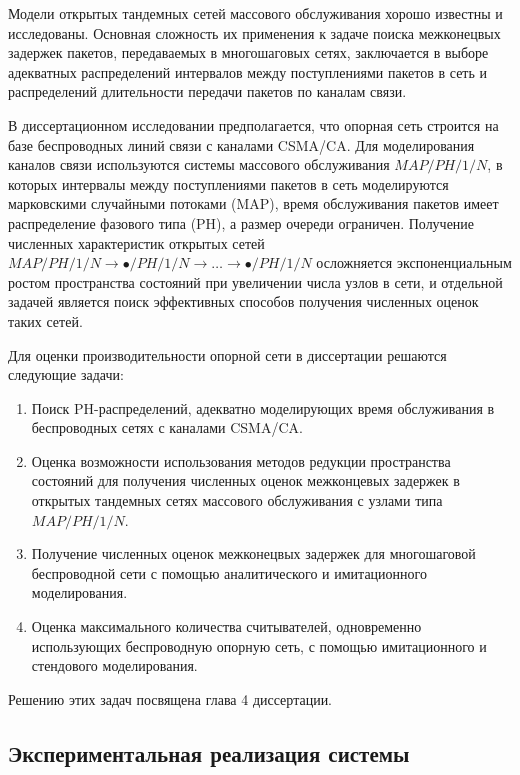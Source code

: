 Модели открытых тандемных сетей массового обслуживания хорошо известны и исследованы. Основная сложность их применения к задаче поиска межконецвых задержек пакетов, передаваемых в многошаговых сетях, заключается в выборе адекватных распределений интервалов между поступлениями пакетов в сеть и распределений длительности передачи пакетов по каналам связи.

В диссертационном исследовании предполагается, что опорная сеть строится на базе беспроводных линий связи с каналами CSMA/CA. Для моделирования каналов связи используются системы массового обслуживания $MAP/PH/1/N$, в которых интервалы между поступлениями пакетов в сеть моделируются марковскими случайными потоками (MAP), время обслуживания пакетов имеет распределение фазового типа (PH), а размер очереди ограничен. Получение численных характеристик открытых сетей $MAP/PH/1/N \rightarrow \bullet/PH/1/N \rightarrow \dots \rightarrow \bullet/PH/1/N$ осложняется экспоненциальным ростом пространства состояний при увеличении числа узлов в сети, и отдельной задачей является поиск эффективных способов получения численных оценок таких сетей.

Для оценки производительности опорной сети в диссертации решаются следующие задачи:

\begin{enumerate}
    \item Поиск PH-распределений, адекватно моделирующих время обслуживания в беспроводных сетях с каналами CSMA/CA.
    \item Оценка возможности использования методов редукции пространства состояний для получения численных оценок межконцевых задержек в открытых тандемных сетях массового обслуживания с узлами типа $MAP/PH/1/N$.
    \item Получение численных оценок межконецвых задержек для многошаговой беспроводной сети с помощью аналитического и имитационного моделирования.
    \item Оценка максимального количества считывателей, одновременно использующих беспроводную опорную сеть, с помощью имитационного и стендового моделирования.
\end{enumerate}

Решению этих задач посвящена глава 4 диссертации.


\subsection{Экспериментальная реализация системы}

